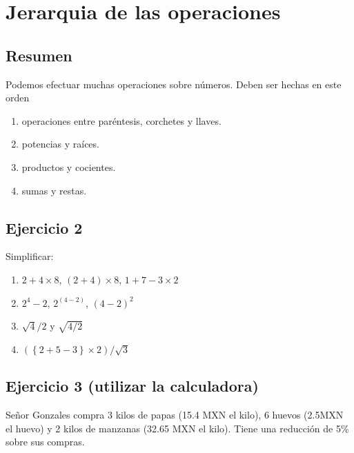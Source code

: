\begin{center}
\end{center}

\section{Jerarquia de las operaciones}

\subsection*{Resumen}

Podemos efectuar muchas operaciones sobre números. Deben ser hechas  en
este orden

\begin{enumerate}
\item operaciones entre paréntesis, corchetes y llaves.
\item potencias y raíces.
\item productos y cocientes.
\item sumas y restas.
\end{enumerate}

\subsection*{Ejercicio 2}

Simplificar:

\begin{enumerate}
\item $2+4\times8$, $(2+4) \times 8$, $1+7-3\times2$
\item $2^4-2$, $2^{\left(4-2\right)}$, $\left(4-2\right)^2$
\item $\sqrt{4}/2$ y $\sqrt{4/2}$
\item $\left(\left\{2+5-3\right\}\times2 \right) / \sqrt{3}$
\end{enumerate}

\subsection*{Ejercicio 3 (utilizar la calculadora)}

Señor Gonzales compra 3 kilos de papas (15.4 MXN el kilo),
6 huevos (2.5MXN el huevo) y 2 kilos de manzanas (32.65 MXN el kilo).
Tiene una reducción de 5\% sobre sus compras.

